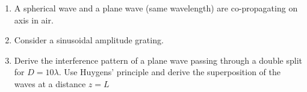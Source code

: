 \documentclass[main.tex]{subfiles}
\begin{document}
\begin{enumerate}
\item{A spherical wave and a plane wave (same wavelength) are co-propagating on axis in air.}
\item{Consider a sinusoidal amplitude grating.}
\item{Derive the interference pattern of a plane wave passing through a double split for $D=10\lambda$. Use Huygens' principle and derive the superposition of the waves at a distance $z=L$}
\end{enumerate}
\end{document}
